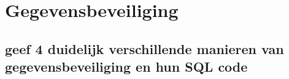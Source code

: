\newpage

\section{Gegevensbeveiliging}

\subsection{geef 4 duidelijk verschillende manieren van gegevensbeveiliging en hun SQL code}
